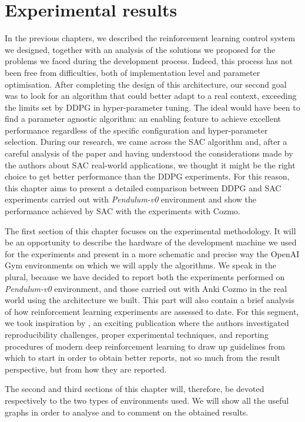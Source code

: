 \chapter{Experimental results} \label{ch:ch5}

In the previous chapters, we described the reinforcement learning control system we designed, together with an analysis of the solutions we proposed for the problems we faced during the development process.
Indeed, this process has not been free from difficulties, both of implementation level and parameter optimisation.
After completing the design of this architecture, our second goal was to look for an algorithm that could better adapt to a real context, exceeding the limits set by DDPG in hyper-parameter tuning.
The ideal would have been to find a parameter agnostic algorithm: an enabling feature to achieve excellent performance regardless of the specific configuration and hyper-parameter selection.
During our research, we came across the SAC algorithm and, after a careful analysis of the paper and having understood the considerations made by the authors about SAC real-world applications, we thought it might be the right choice to get better performance than the DDPG experiments.
For this reason, this chapter aims to present a detailed comparison between DDPG and SAC experiments carried out with \textit{Pendulum-v0} environment and show the performance achieved by SAC with the experiments with Cozmo.

The first section of this chapter focuses on the experimental methodology.
It will be an opportunity to describe the hardware of the development machine we used for the experiments and present in a more schematic and precise way the OpenAI Gym environments on which we will apply the algorithms.
We speak in the plural, because we have decided to report both the experiments performed on \textit{Pendulum-v0} environment, and those carried out with Anki Cozmo in the real world using the architecture we built.
This part will also contain a brief analysis of how reinforcement learning experiments are assessed to date.
For this segment, we took inspiration by \cite{henderson2018deep}, an exciting publication where the authors investigated reproducibility challenges, proper experimental techniques, and reporting procedures of modern deep reinforcement learning to draw up guidelines from which to start in order to obtain better reports, not so much from the result perspective, but from how they are reported.

The second and third sections of this chapter will, therefore, be devoted respectively to the two types of environments used.
We will show all the useful graphs in order to analyse and to comment on the obtained results.

